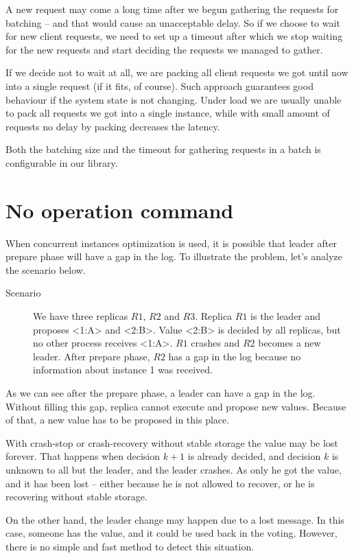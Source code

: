 A new request may come a long time after we begun gathering the requests for batching -- and that would cause an unacceptable delay. So if we choose to wait for new client requests, we need to set up a timeout after which we stop waiting for the new requests and start deciding the requests we managed to gather.

If we decide not to wait at all, we are packing all client requests we got until now into a single request (if it fits, of course). Such approach guarantees good behaviour if the system state is not changing. Under load  we are usually unable to pack all requests we got into a single instance, while with small amount of requests no delay by packing decreases the latency.

Both the batching size and the timeout for gathering requests in a batch is con\-figurable in our library.


\section{No operation command}

When concurrent instances optimization is used, it is possible that leader after prepare phase will have a gap in the log. To illustrate the problem, let's analyze the scenario below.

\begin{description}
  \item [Scenario] We have three replicas $R1$, $R2$ and $R3$. Replica $R1$ is the leader and proposes <1:A> and <2:B>. Value <2:B> is decided by all replicas, but no other process receives <1:A>. $R1$ crashes and $R2$ becomes a new leader. After prepare phase, $R2$ has a gap in the log because no information about instance 1 was received.
\end{description} 

As we can see after the prepare phase, a leader can have a gap in the log. Without filling this gap, replica cannot execute and propose new values. Because of that, a new value has to be proposed in this place.

With crash-stop or crash-recovery without stable storage the value may be lost forever. That happens when decision $k+1$ is already decided, and decision $k$ is unknown to all but the leader, and the leader crashes. As only he got the value, and it has been lost -- either because he is not allowed to recover, or he is recovering without stable storage.

On the other hand, the leader change may happen due to a lost \alive message. \linebreak In this case, someone has the value, and it could be used back in the voting. However, there is no simple and fast method to detect this situation.

